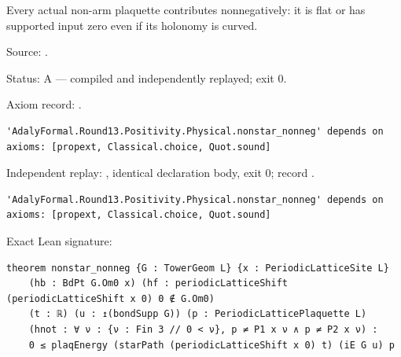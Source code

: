 \begin{theorem}[bp-478]
\label{bp-478}
\leanok
Every actual non-arm plaquette contributes nonnegatively: it is flat or has supported input zero even if its holonomy is curved.

\par Source: \texttt{}.
\par Status: A — compiled and independently replayed; exit 0.
\par Axiom record: \texttt{}.
\begin{verbatim}
'AdalyFormal.Round13.Positivity.Physical.nonstar_nonneg' depends on axioms: [propext, Classical.choice, Quot.sound]
\end{verbatim}
\par Independent replay: \texttt{}, identical declaration body, exit 0; record \texttt{}.
\begin{verbatim}
'AdalyFormal.Round13.Positivity.Physical.nonstar_nonneg' depends on axioms: [propext, Classical.choice, Quot.sound]
\end{verbatim}
\par Exact Lean signature:
\begin{verbatim}
theorem nonstar_nonneg {G : TowerGeom L} {x : PeriodicLatticeSite L}
    (hb : BdPt G.Om0 x) (hf : periodicLatticeShift (periodicLatticeShift x 0) 0 ∉ G.Om0)
    (t : ℝ) (u : ↥(bondSupp G)) (p : PeriodicLatticePlaquette L)
    (hnot : ∀ ν : {ν : Fin 3 // 0 < ν}, p ≠ P1 x ν ∧ p ≠ P2 x ν) :
    0 ≤ plaqEnergy (starPath (periodicLatticeShift x 0) t) (iE G u) p
\end{verbatim}
\end{theorem}

